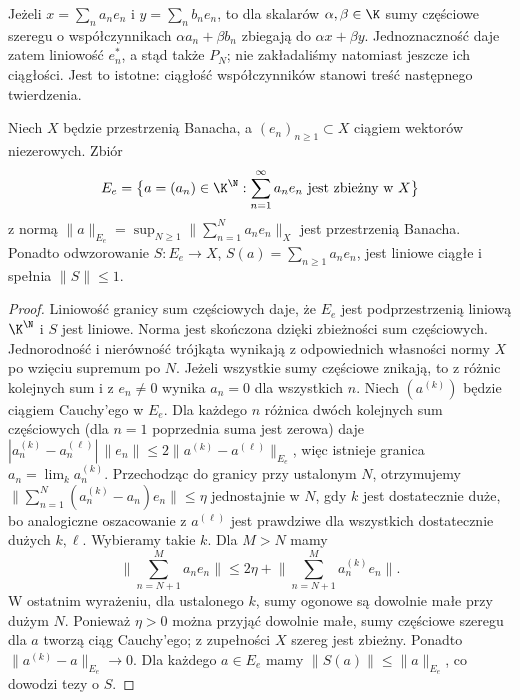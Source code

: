Jeżeli $x=\sum_na_ne_n$ i $y=\sum_nb_ne_n$, to dla skalarów
$\alpha,\beta\in\K$ sumy częściowe szeregu o współczynnikach
$\alpha a_n+\beta b_n$ zbiegają do $\alpha x+\beta y$.
Jednoznaczność daje zatem liniowość $e_n^*$, a stąd także $P_N$;
nie zakładaliśmy natomiast jeszcze ich ciągłości. Jest to istotne: ciągłość
współczynników stanowi treść następnego twierdzenia.

\begin{lemat}
\label{lem:coefficient-space27}
Niech $X$ będzie przestrzenią Banacha, a $(e_n)_{n\ge1}\subset X$
ciągiem wektorów niezerowych. Zbiór
\[
E_e=\bigl\{a=(a_n)\in\K^{\N}:\sum_{n=1}^{\infty}a_ne_n
\text{ jest zbieżny w }X\bigr\}
\]
z normą $\|a\|_{E_e}=\sup_{N\ge1}\|\sum_{n=1}^Na_ne_n\|_X$
jest przestrzenią Banacha. Ponadto odwzorowanie
$S:E_e\to X$, $S(a)=\sum_{n\ge1}a_ne_n$, jest liniowe
ciągłe i spełnia $\|S\|\le1$.
\end{lemat}
\begin{proof}
Liniowość granicy sum częściowych daje, że $E_e$ jest
podprzestrzenią liniową $\K^{\N}$ i $S$ jest liniowe.
Norma jest skończona dzięki zbieżności sum częściowych.
Jednorodność i nierówność trójkąta wynikają z odpowiednich
własności normy $X$ po wzięciu supremum po $N$.
Jeżeli wszystkie sumy częściowe znikają, to z różnic kolejnych
sum i z $e_n\ne0$ wynika $a_n=0$ dla wszystkich $n$.
Niech $(a^{(k)})$ będzie ciągiem Cauchy'ego w $E_e$.
Dla każdego $n$ różnica dwóch kolejnych sum częściowych
(dla $n=1$ poprzednia suma jest zerowa) daje
$|a_n^{(k)}-a_n^{(\ell)}|\,\|e_n\|
\le2\|a^{(k)}-a^{(\ell)}\|_{E_e}$,
więc istnieje granica $a_n=\lim_k a_n^{(k)}$.
Przechodząc do granicy przy ustalonym $N$, otrzymujemy
$\|\sum_{n=1}^N(a_n^{(k)}-a_n)e_n\|\le\eta$
jednostajnie w $N$, gdy $k$ jest dostatecznie duże,
bo analogiczne oszacowanie z $a^{(\ell)}$ jest
prawdziwe dla wszystkich dostatecznie dużych $k,\ell$.
Wybieramy takie $k$. Dla $M>N$ mamy
\[
\Big\|\sum_{n=N+1}^Ma_ne_n\Big\|
\le2\eta+\Big\|\sum_{n=N+1}^Ma_n^{(k)}e_n\Big\|.
\]
W ostatnim wyrażeniu, dla ustalonego $k$, sumy ogonowe
są dowolnie małe przy dużym $N$. Ponieważ $\eta>0$
można przyjąć dowolnie małe, sumy częściowe szeregu dla $a$
tworzą ciąg Cauchy'ego; z zupełności $X$ szereg jest zbieżny.
Ponadto $\|a^{(k)}-a\|_{E_e}\to0$.
Dla każdego $a\in E_e$ mamy
$\|S(a)\|\le\|a\|_{E_e}$, co dowodzi tezy o $S$.
\end{proof}

